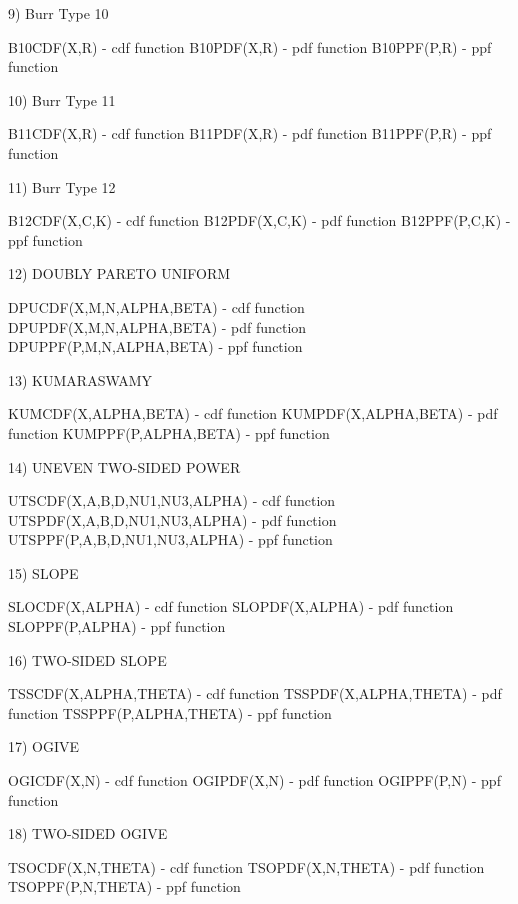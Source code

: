 {        9) Burr Type 10
 
           B10CDF(X,R)                   - cdf function
           B10PDF(X,R)                   - pdf function
           B10PPF(P,R)                   - ppf function
 
       10) Burr Type 11
 
           B11CDF(X,R)                   - cdf function
           B11PDF(X,R)                   - pdf function
           B11PPF(P,R)                   - ppf function
 
       11) Burr Type 12
 
           B12CDF(X,C,K)                 - cdf function
           B12PDF(X,C,K)                 - pdf function
           B12PPF(P,C,K)                 - ppf function
 
       12) DOUBLY PARETO UNIFORM
 
           DPUCDF(X,M,N,ALPHA,BETA)      - cdf function
           DPUPDF(X,M,N,ALPHA,BETA)      - pdf function
           DPUPPF(P,M,N,ALPHA,BETA)      - ppf function

       13) KUMARASWAMY
 
           KUMCDF(X,ALPHA,BETA)          - cdf function
           KUMPDF(X,ALPHA,BETA)          - pdf function
           KUMPPF(P,ALPHA,BETA)          - ppf function

       14) UNEVEN TWO-SIDED POWER
 
           UTSCDF(X,A,B,D,NU1,NU3,ALPHA) - cdf function
           UTSPDF(X,A,B,D,NU1,NU3,ALPHA) - pdf function
           UTSPPF(P,A,B,D,NU1,NU3,ALPHA) - ppf function

       15) SLOPE
 
           SLOCDF(X,ALPHA)               - cdf function
           SLOPDF(X,ALPHA)               - pdf function
           SLOPPF(P,ALPHA)               - ppf function

       16) TWO-SIDED SLOPE
 
           TSSCDF(X,ALPHA,THETA)         - cdf function
           TSSPDF(X,ALPHA,THETA)         - pdf function
           TSSPPF(P,ALPHA,THETA)         - ppf function

       17) OGIVE
 
           OGICDF(X,N)                   - cdf function
           OGIPDF(X,N)                   - pdf function
           OGIPPF(P,N)                   - ppf function

       18) TWO-SIDED OGIVE
 
           TSOCDF(X,N,THETA)             - cdf function
           TSOPDF(X,N,THETA)             - pdf function
           TSOPPF(P,N,THETA)             - ppf function

}
